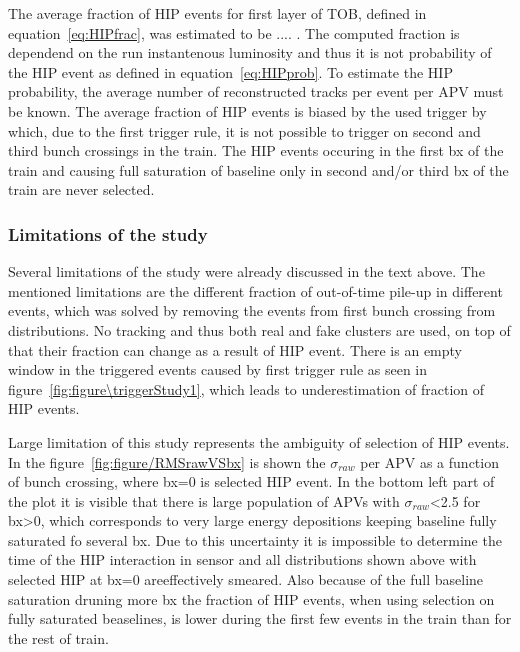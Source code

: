 The average fraction of HIP events for first layer of TOB, defined in equation~\ref{eq:HIPfrac}, was estimated to be .... . The computed fraction is dependend on the run instantenous luminosity and thus it is not probability of the HIP event as defined in equation~\ref{eq:HIPprob}. To estimate the HIP probability, the average number of reconstructed tracks per event per APV must be known. The average fraction of HIP events is biased by the used trigger by which, due to the first trigger rule, it is not possible to trigger on second and third bunch crossings in the train. The HIP events occuring in the first bx of the train and causing full saturation of baseline only in second and/or third bx of the train are never selected.
 

\subsubsection{Limitations of the study}

Several limitations of the study were already discussed in the text above. The mentioned limitations are the different fraction of out-of-time pile-up in different events, which was solved by removing the events from first bunch crossing from distributions. No tracking and thus both real and fake clusters are used, on top of that their fraction can change as a result of HIP event. There is an empty window in the triggered events caused by first trigger rule as seen in figure~\ref{fig:figure\triggerStudy1}, which leads to underestimation of fraction of HIP events.


Large limitation of this study represents the ambiguity of selection of HIP events. In the figure~\ref{fig:figure/RMSrawVSbx} is shown the $\sigma_{raw}$ per APV as a function of bunch crossing, where bx=0 is selected HIP event. In the bottom left part of the plot it is visible that there is large population of APVs with $\sigma_{raw}$<2.5 for bx>0, which corresponds to very large energy depositions keeping baseline fully saturated fo several bx. Due to this uncertainty it is impossible to determine the time of the HIP interaction in sensor and all distributions shown above with selected HIP at bx=0 areeffectively smeared. Also because of the full baseline saturation druning more bx the fraction of HIP events, when using selection on fully saturated beaselines, is lower during the first few events in the train than for the rest of train.

